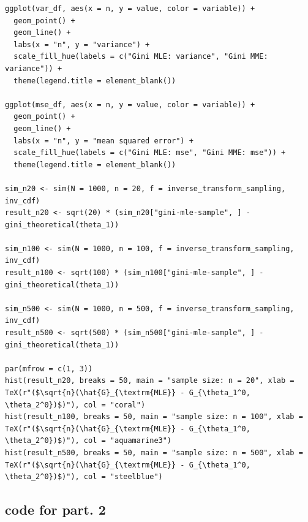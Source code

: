\begin{verbatim}
ggplot(var_df, aes(x = n, y = value, color = variable)) +
  geom_point() + 
  geom_line() +
  labs(x = "n", y = "variance") +
  scale_fill_hue(labels = c("Gini MLE: variance", "Gini MME: variance")) +
  theme(legend.title = element_blank())

ggplot(mse_df, aes(x = n, y = value, color = variable)) +
  geom_point() + 
  geom_line() +
  labs(x = "n", y = "mean squared error") + 
  scale_fill_hue(labels = c("Gini MLE: mse", "Gini MME: mse")) +
  theme(legend.title = element_blank())

sim_n20 <- sim(N = 1000, n = 20, f = inverse_transform_sampling, inv_cdf)
result_n20 <- sqrt(20) * (sim_n20["gini-mle-sample", ] - gini_theoretical(theta_1))

sim_n100 <- sim(N = 1000, n = 100, f = inverse_transform_sampling, inv_cdf)
result_n100 <- sqrt(100) * (sim_n100["gini-mle-sample", ] - gini_theoretical(theta_1))

sim_n500 <- sim(N = 1000, n = 500, f = inverse_transform_sampling, inv_cdf)
result_n500 <- sqrt(500) * (sim_n500["gini-mle-sample", ] - gini_theoretical(theta_1))

par(mfrow = c(1, 3))
hist(result_n20, breaks = 50, main = "sample size: n = 20", xlab = TeX(r"($\sqrt{n}(\hat{G}_{\textrm{MLE}} - G_{\theta_1^0, \theta_2^0})$)"), col = "coral")
hist(result_n100, breaks = 50, main = "sample size: n = 100", xlab = TeX(r"($\sqrt{n}(\hat{G}_{\textrm{MLE}} - G_{\theta_1^0, \theta_2^0})$)"), col = "aquamarine3")
hist(result_n500, breaks = 50, main = "sample size: n = 500", xlab = TeX(r"($\sqrt{n}(\hat{G}_{\textrm{MLE}} - G_{\theta_1^0, \theta_2^0})$)"), col = "steelblue")
\end{verbatim}

\subsection{code for part. 2}

